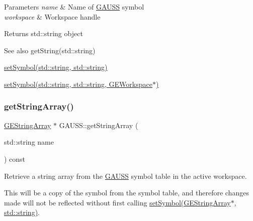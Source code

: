 \begin{DoxyParams}{Parameters}
{\em name} & Name of \hyperlink{class_g_a_u_s_s}{G\+A\+U\+SS} symbol \\
\hline
{\em workspace} & Workspace handle \\
\hline
\end{DoxyParams}
\begin{DoxyReturn}{Returns}
std\+::string object
\end{DoxyReturn}
\begin{DoxySeeAlso}{See also}
get\+String(std\+::string) 

\hyperlink{class_g_a_u_s_s_aa37c658d30c98dd8e38a8ce682083a10}{set\+Symbol(std\+::string, std\+::string)} 

\hyperlink{class_g_a_u_s_s_a7bf4d629d539c1cba827ec59220b4659}{set\+Symbol(std\+::string, std\+::string, G\+E\+Workspace$\ast$)} 
\end{DoxySeeAlso}
\mbox{\label{class_g_a_u_s_s_ad8406a03d1699e341b6fea1d51b97f29}} 
\subsubsection{\texorpdfstring{get\+String\+Array()}{getStringArray()}\hspace{0.1cm}{\footnotesize\ttfamily [1/2]}}
{\footnotesize\ttfamily \hyperlink{class_g_e_string_array}{G\+E\+String\+Array} $\ast$ G\+A\+U\+S\+S\+::get\+String\+Array (\begin{DoxyParamCaption}\item[{std\+::string}]{name }\end{DoxyParamCaption}) const}



Retrieve a string array from the \hyperlink{class_g_a_u_s_s}{G\+A\+U\+SS} symbol table in the active workspace. 

This will be a copy of the symbol from the symbol table, and therefore changes made will not be reflected without first calling \hyperlink{class_g_a_u_s_s_ac73f4a999e796eccb2728f1f914baff6}{set\+Symbol(\+G\+E\+String\+Array$\ast$, std\+::string)}.


